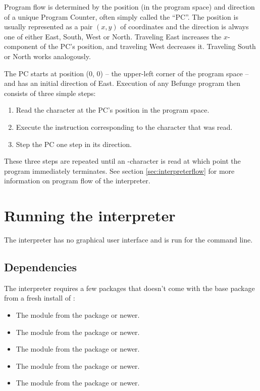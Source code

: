 \documentclass[12pt, a4paper]{article}
\begin{document}
Program flow is determined by the position (in the program space) and direction of a unique Program Counter, often simply called the “PC”. The position is usually represented as a pair $(x, y)$ of coordinates and the direction is always one of either East, South, West or North. Traveling East increases the $x$-component of the PC's position, and traveling West decreases it. Traveling South or North works analogously.

The PC starts at position (0, 0) -- the upper-left corner of the program space -- and has an initial direction of East. Execution of any Befunge program then consists of three simple steps:
\begin{enumerate}

\item Read the character at the PC's position in the program space.
\item Execute the instruction corresponding to the character that was read.
\item Step the PC one step in its direction.

\end{enumerate}
These three steps are repeated until an -character is read at which point the program immediately terminates. See section \ref{sec:interpreterflow} for more information on program flow of the interpreter.

\section{Running the interpreter}
\label{sec:howtorun}

The interpreter has no graphical user interface and is run for the command line.

\subsection{Dependencies}
\label{sec:dependencies}

The interpreter requires a few packages that doesn't come with the base package from a fresh install of :

\begin{itemize}
\item The module  from the package  or newer.
\item The module  from the package  or newer.
\item The module  from the package  or newer.
\item The module  from the package  or newer.
\item The module  from the package  or newer.
\end{itemize}
\end{document}
